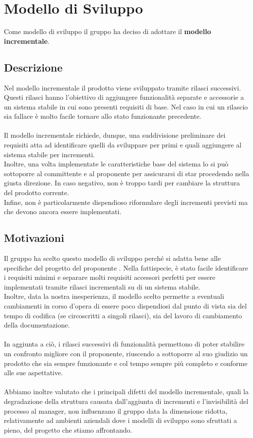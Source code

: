 \section{Modello di Sviluppo}
Come modello di sviluppo il gruppo \Gruppo{} ha deciso di adottare il \textbf{modello incrementale}.
\subsection{Descrizione}
Nel modello incrementale il prodotto viene sviluppato tramite rilasci successivi. Questi rilasci hanno l'obiettivo di aggiungere funzionalità separate e accessorie a un sistema stabile in cui sono presenti requisiti di base.
Nel caso in cui un rilascio sia fallace è molto facile tornare allo stato funzionante precedente.\\
\\Il modello incrementale richiede, dunque, una suddivisione preliminare dei requisiti atta ad identificare quelli da sviluppare per primi e quali aggiungere al sistema stabile per incrementi. \\
Inoltre, una volta implementate le caratteristiche base del sistema lo si può sottoporre al committente e al proponente per assicurarsi di star procedendo nella giusta direzione.
In caso negativo, non è troppo tardi per cambiare la struttura del prodotto corrente. \\
Infine, non è particolarmente dispendioso riformulare degli incrementi previsti ma che devono ancora essere implementati. 

\subsection{Motivazioni}
Il gruppo ha scelto questo modello di sviluppo perché si adatta bene alle specifiche del progetto \NomeProgetto{} del proponente \Proponente{}.
Nella fattispecie, è stato facile identificare i requisiti minimi e separare molti requisiti accessori perfetti per essere implementati tramite rilasci incrementali su di un sistema stabile.\\
Inoltre, data la nostra inesperienza, il modello scelto permette a eventuali cambiamenti in corso d'opera di essere poco dispendiosi dal punto di vista sia del tempo di codifica (se circoscritti a singoli rilasci), sia del lavoro di cambiamento della documentazione. \\
\\In aggiunta a ciò, i rilasci successivi di funzionalità permettono di poter stabilire un confronto migliore con il proponente, riuscendo a sottoporre al suo giudizio un prodotto che sia sempre funzionante e col tempo sempre più completo e conforme alle sue aspettative. \\
\\Abbiamo inoltre valutato che i principali difetti del modello incrementale, quali la degradazione della struttura causata dall'aggiunta di incrementi e l'invisibilità del processo al manager, 
non influenzano il gruppo data la dimensione ridotta, relativamente ad ambienti aziendali dove i modelli di sviluppo sono sfruttati a pieno, del progetto che stiamo affrontando.


